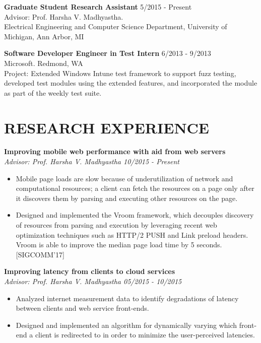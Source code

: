 \documentclass[zhemargin]{res}
\begin{document}
\begin{resume}
    \textbf{Graduate Student Research Assistant} \hfill 5/2015 - Present \\
    Advisor: Prof. Harsha V. Madhyastha.\\
    Electrical Engineering and Computer Science Department, University of Michigan, Ann Arbor, MI

    \textbf{Software Developer Engineer in Test Intern} \hfill 6/2013 - 9/2013 \\
    Microsoft. Redmond, WA\\
    Project: Extended Windows Intune test framework to support fuzz testing, developed test modules
    using the extended features, and incorporated the module as part of the weekly test suite.



\section{\small RESEARCH EXPERIENCE}
	\textbf{Improving mobile web performance with aid from web servers}\\
    \textit{Advisor: Prof. Harsha V. Madhyastha \hfill 10/2015 - Present}
	\begin{itemize}
    \item Mobile page loads are slow because of underutilization of network and computational
      resources; a client can fetch the resources on a page only after it
      discovers them by parsing and executing other resources on the page.

    \item Designed and implemented the Vroom framework, which decouples discovery of
      resources from parsing and execution by leveraging recent web optimization
      techniques such as HTTP/2 PUSH and Link preload headers. Vroom is able to improve
      the median page load time by 5 seconds. [SIGCOMM'17]
	\end{itemize}

	\textbf{Improving latency from clients to cloud services}\\
    \textit{Advisor: Prof. Harsha V. Madhyastha \hfill 05/2015 - 10/2015}
	\begin{itemize}
    \item Analyzed internet measurement data to identify degradations of
      latency between clients and web service front-ends.
    \item Designed and implemented an algorithm for dynamically varying
      which front-end a client is redirected to in order to minimize the
      user-perceived latencies.
	\end{itemize}


\end{resume}
\end{document}
